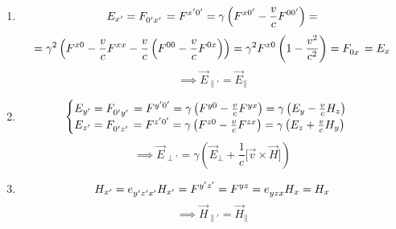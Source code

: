 \documentclass{article}
\begin{document}
\begin{enumerate}
    \item
    \begin{equation*}
        E_{x'}=\tensor{F}{_{0'}_{x'}}=\tensor{F}{^{x'}^{0'}}=\gamma\left(\tensor{F}{^{x}^{0'}}-\frac{v}{c}\tensor{F}{^{0}^{0'}}\right)=
    \end{equation*}
    \begin{equation*}
        =\gamma^2\left(\tensor{F}{^{x}^{0}}-\frac{v}{c}\tensor{F}{^{x}^{x}}-\frac{v}{c}\left(\tensor{F}{^{0}^{0}}-\frac{v}{c}\tensor{F}{^{0}^{x}}\right)\right)=\gamma^2\tensor{F}{^{x}^{0}}\left(1-\frac{v^2}{c^2}\right)=\tensor{F}{_{0}_{x}}=E_x
    \end{equation*}
    \begin{equation*}
        \implies \vec{E}_{\parallel'}=\vec{E}_\parallel
    \end{equation*}
    
    \item
    \begin{equation*}
        \begin{cases}
        E_{y'}=\tensor{F}{_{0'}_{y'}}=\tensor{F}{^{y'}^{0'}}=\gamma\left(\tensor{F}{^{y}^{0}}-\frac{v}{c}\tensor{F}{^{y}^{x}}\right)=\gamma\left(E_y-\frac{v}{c}H_z\right)\\
        E_{z'}=\tensor{F}{_{0'}_{z'}}=\tensor{F}{^{z'}^{0'}}=\gamma\left(\tensor{F}{^{z}^{0}}-\frac{v}{c}\tensor{F}{^{z}^{x}}\right)=\gamma\left(E_z+\frac{v}{c}H_y\right)
        \end{cases}
    \end{equation*}
    \begin{equation*}
        \implies
        \vec{E}_{\perp'}=\gamma\left(\vec{E}_\perp+\frac{1}{c}\lbrack\vec{v}\times\vec{H}\rbrack\right)
    \end{equation*}
    
    \item
    \begin{equation*}
        H_{x'}=\tensor{e}{_{y'}_{z'}_{x'}}H_{x'}=\tensor{F}{^{y'}^{z'}}=\tensor{F}{^{y}^{z}}=\tensor{e}{_{y}_{z}_{x}}H_{x}=H_{x}
    \end{equation*}
    \begin{equation*}
        \implies \vec{H}_{\parallel'}=\vec{H}_\parallel
    \end{equation*}
    

\end{enumerate}
\end{document}
